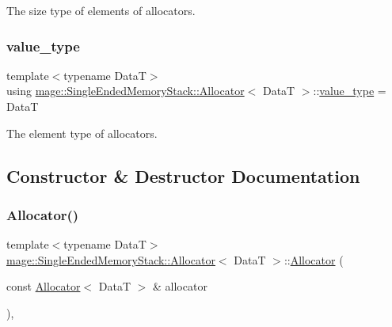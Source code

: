 The size type of elements of allocators. \hypertarget{structmage_1_1_single_ended_memory_stack_1_1_allocator_a4d5b98a534ad4e6d6f2d8eb1280398ab}{}\label{structmage_1_1_single_ended_memory_stack_1_1_allocator_a4d5b98a534ad4e6d6f2d8eb1280398ab} 
\subsubsection{\texorpdfstring{value\+\_\+type}{value\_type}}
{\footnotesize\ttfamily template$<$typename DataT$>$ \\
using \hyperlink{structmage_1_1_single_ended_memory_stack_1_1_allocator}{mage\+::\+Single\+Ended\+Memory\+Stack\+::\+Allocator}$<$ DataT $>$\+::\hyperlink{structmage_1_1_single_ended_memory_stack_1_1_allocator_a4d5b98a534ad4e6d6f2d8eb1280398ab}{value\+\_\+type} =  DataT}

The element type of allocators. 

\subsection{Constructor \& Destructor Documentation}
\hypertarget{structmage_1_1_single_ended_memory_stack_1_1_allocator_aee59bcea14f37d52f7f716a02da9dc41}{}\label{structmage_1_1_single_ended_memory_stack_1_1_allocator_aee59bcea14f37d52f7f716a02da9dc41} 
\subsubsection{\texorpdfstring{Allocator()}{Allocator()}\hspace{0.1cm}{\footnotesize\ttfamily [1/4]}}
{\footnotesize\ttfamily template$<$typename DataT$>$ \\
\hyperlink{structmage_1_1_single_ended_memory_stack_1_1_allocator}{mage\+::\+Single\+Ended\+Memory\+Stack\+::\+Allocator}$<$ DataT $>$\+::\hyperlink{structmage_1_1_single_ended_memory_stack_1_1_allocator}{Allocator} (\begin{DoxyParamCaption}\item[{const \hyperlink{structmage_1_1_single_ended_memory_stack_1_1_allocator}{Allocator}$<$ DataT $>$ \&}]{allocator }\end{DoxyParamCaption})\hspace{0.3cm}{\ttfamily [default]}, {\ttfamily [noexcept]}}

